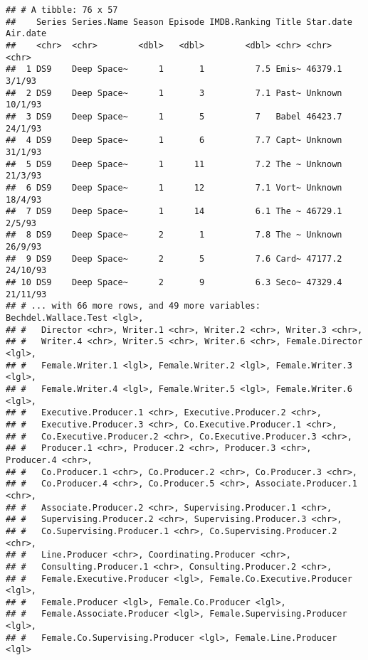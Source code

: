 \documentclass[
]{article}
\newenvironment{Shaded}{\begin{snugshade}}{\end{snugshade}}
\newcommand{\KeywordTok}[1]{\textcolor[rgb]{0.13,0.29,0.53}{\textbf{#1}}}
\newcommand{\NormalTok}[1]{#1}
\newcommand{\OperatorTok}[1]{\textcolor[rgb]{0.81,0.36,0.00}{\textbf{#1}}}
\begin{document}
\begin{verbatim}
## # A tibble: 76 x 57
##    Series Series.Name Season Episode IMDB.Ranking Title Star.date Air.date
##    <chr>  <chr>        <dbl>   <dbl>        <dbl> <chr> <chr>     <chr>   
##  1 DS9    Deep Space~      1       1          7.5 Emis~ 46379.1   3/1/93  
##  2 DS9    Deep Space~      1       3          7.1 Past~ Unknown   10/1/93 
##  3 DS9    Deep Space~      1       5          7   Babel 46423.7   24/1/93 
##  4 DS9    Deep Space~      1       6          7.7 Capt~ Unknown   31/1/93 
##  5 DS9    Deep Space~      1      11          7.2 The ~ Unknown   21/3/93 
##  6 DS9    Deep Space~      1      12          7.1 Vort~ Unknown   18/4/93 
##  7 DS9    Deep Space~      1      14          6.1 The ~ 46729.1   2/5/93  
##  8 DS9    Deep Space~      2       1          7.8 The ~ Unknown   26/9/93 
##  9 DS9    Deep Space~      2       5          7.6 Card~ 47177.2   24/10/93
## 10 DS9    Deep Space~      2       9          6.3 Seco~ 47329.4   21/11/93
## # ... with 66 more rows, and 49 more variables: Bechdel.Wallace.Test <lgl>,
## #   Director <chr>, Writer.1 <chr>, Writer.2 <chr>, Writer.3 <chr>,
## #   Writer.4 <chr>, Writer.5 <chr>, Writer.6 <chr>, Female.Director <lgl>,
## #   Female.Writer.1 <lgl>, Female.Writer.2 <lgl>, Female.Writer.3 <lgl>,
## #   Female.Writer.4 <lgl>, Female.Writer.5 <lgl>, Female.Writer.6 <lgl>,
## #   Executive.Producer.1 <chr>, Executive.Producer.2 <chr>,
## #   Executive.Producer.3 <chr>, Co.Executive.Producer.1 <chr>,
## #   Co.Executive.Producer.2 <chr>, Co.Executive.Producer.3 <chr>,
## #   Producer.1 <chr>, Producer.2 <chr>, Producer.3 <chr>, Producer.4 <chr>,
## #   Co.Producer.1 <chr>, Co.Producer.2 <chr>, Co.Producer.3 <chr>,
## #   Co.Producer.4 <chr>, Co.Producer.5 <chr>, Associate.Producer.1 <chr>,
## #   Associate.Producer.2 <chr>, Supervising.Producer.1 <chr>,
## #   Supervising.Producer.2 <chr>, Supervising.Producer.3 <chr>,
## #   Co.Supervising.Producer.1 <chr>, Co.Supervising.Producer.2 <chr>,
## #   Line.Producer <chr>, Coordinating.Producer <chr>,
## #   Consulting.Producer.1 <chr>, Consulting.Producer.2 <chr>,
## #   Female.Executive.Producer <lgl>, Female.Co.Executive.Producer <lgl>,
## #   Female.Producer <lgl>, Female.Co.Producer <lgl>,
## #   Female.Associate.Producer <lgl>, Female.Supervising.Producer <lgl>,
## #   Female.Co.Supervising.Producer <lgl>, Female.Line.Producer <lgl>
\end{verbatim}

\begin{Shaded}
\end{Shaded}
\end{document}
